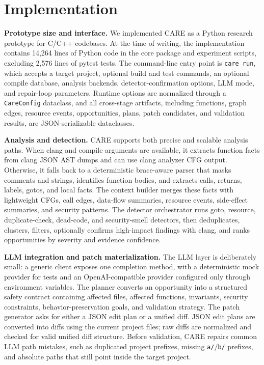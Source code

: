 \providecommand{\SysName}{CARE}

\section{Implementation}
\label{sec:implementation}

\noindent\textbf{Prototype size and interface.}
We implemented \SysName{} as a Python research prototype for C/C++ codebases.
At the time of writing, the implementation contains 14,264 lines of Python code
in the core package and experiment scripts, excluding 2,576 lines of pytest
tests. The command-line entry point is \texttt{care run}, which accepts a target
project, optional build and test commands, an optional compile database,
analysis backends, detector-confirmation options, LLM mode, and repair-loop
parameters. Runtime options are normalized through a \texttt{CareConfig}
dataclass, and all cross-stage artifacts, including functions, graph edges,
resource events, opportunities, plans, patch candidates, and validation results,
are JSON-serializable dataclasses.

\noindent\textbf{Analysis and detection.}
\SysName{} supports both precise and scalable analysis paths. When clang and
compile arguments are available, it extracts function facts from clang JSON AST
dumps and can use clang analyzer CFG output. Otherwise, it falls back to a
deterministic brace-aware parser that masks comments and strings, identifies
function bodies, and extracts calls, returns, labels, gotos, and local facts.
The context builder merges these facts with lightweight CFGs, call edges,
data-flow summaries, resource events, side-effect summaries, and security
patterns. The detector orchestrator runs goto, resource, duplicate-check,
dead-code, and security-smell detectors, then deduplicates, clusters, filters,
optionally confirms high-impact findings with clang, and ranks opportunities by
severity and evidence confidence.

\noindent\textbf{LLM integration and patch materialization.}
The LLM layer is deliberately small: a generic client exposes one completion
method, with a deterministic mock provider for tests and an OpenAI-compatible
provider configured only through environment variables. The planner converts an
opportunity into a structured safety contract containing affected files,
affected functions, invariants, security constraints, behavior-preservation
goals, and validation strategy. The patch generator asks for either a JSON edit
plan or a unified diff. JSON edit plans are converted into diffs using the
current project files; raw diffs are normalized and checked for valid unified
diff structure. Before validation, \SysName{} repairs common LLM path mistakes,
such as duplicated project prefixes, missing \texttt{a/}/\texttt{b/} prefixes,
and absolute paths that still point inside the target project.

